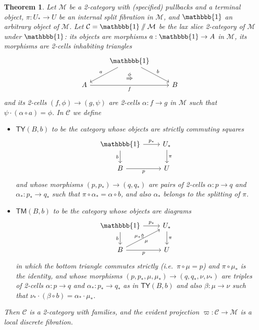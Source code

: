 \documentclass[10pt]{article}
\newtheorem{theorem}{Theorem}
\theoremstyle{definition}
\newcommand\M{\mathcal{M}}
\newcommand\C{\mathcal{C}}
\newcommand\Cty{\mathsf{TY}}
\newcommand\Ctm{\mathsf{TM}}
\newcommand\vp{\varpi}
\newcommand\one{\mathbbb{1}}
\let\lslice\sslash
\newcommand\Un{U}
\newcommand\Ub{U_*}
\newcommand\pb{p_*}
\newcommand\qb{q_*}
\newcommand\alb{\alpha_*}
\newcommand\mub{\mu_*}
\newcommand\nub{\nu_*}
\begin{document}
\begin{theorem}\label{thm:fib2cwf-univ}
  Let $\M$ be a 2-category with (specified) pullbacks and a terminal object, $\pi:\Ub\to\Un$ be an internal split fibration in $\M$, and $\one$ an arbitrary object of $\M$. %
  Let $\C = \one\lslice\M$ be the lax slice 2-category of $\M$ under $\one$: its objects are morphisms $a:\one\to A$ in $\M$, its morphisms are 2-cells inhabiting triangles
  \begin{equation}\label{eq:laxslice-mor}
    \begin{tikzcd}
      & \one \ar[dl,"a"'] \ar[dr,"b"] \ar[d,phantom,"\overset{\phi}{\Rightarrow}"] \\
      A \ar[rr,"f"'] & {}& B
    \end{tikzcd}
  \end{equation}
  and its 2-cells $(f,\phi) \to (g,\psi)$ are 2-cells $\alpha :f\to g$ in $\M$ such that $\psi\cdot (\alpha\circ a) = \phi$.
  In $\C$ we define
  \begin{itemize}
  \item $\Cty(B,b)$ to be the category whose objects are strictly commuting squares
    \[
      \begin{tikzcd}
        \one \ar[d,"b"'] \ar[r,"\pb"] & \Ub \ar[d,"\pi"] \\
        B \ar[r,"p"'] & \Un
      \end{tikzcd}
    \]
    and whose morphisms $(p,\pb) \to (q,\qb)$ are pairs of 2-cells $\alpha:p\to q$ and $\alb : \pb \to \qb$ such that $\pi \circ \alb = \alpha\circ  b$, and also $\alb$ belongs to the splitting of $\pi$.
  \item $\Ctm(B,b)$ to be the category whose objects are diagrams
    \[
      \begin{tikzcd}
        \one \ar[d,"b"'] \ar[r,"\pb"] \ar[dr,phantom,near start,"\scriptstyle\mub\Uparrow"] & \Ub \ar[d,"\pi"] \\
        B \ar[r,"p"']\ar[ur,"\mu"'] & \Un
      \end{tikzcd}
    \]
    in which the bottom triangle commutes strictly (i.e.\ $\pi\circ \mu = p$) and $\pi\circ \mub$ is the identity, and whose morphisms $(p,\pb,\mu,\mub) \to (q,\qb,\nu,\nub)$ are triples of 2-cells $\alpha:p\to q$ and $\alb : \pb \to \qb$ as in $\Cty(B,b)$ and also $\beta:\mu\to\nu$ such that $\nub \cdot (\beta\circ b) = \alb \cdot \mub$.
  \end{itemize}
  Then $\C$ is a 2-category with families, and the evident projection $\vp:\C\to\M$ is a local discrete fibration.
\end{theorem}
\end{document}
